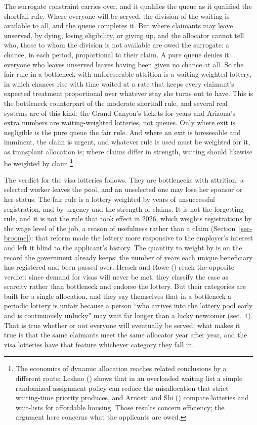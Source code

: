 \documentclass[
  11pt,
  letterpaper,
  DIV=11,
  numbers=noendperiod,
  twoside]{scrartcl}
\begin{document}
The surrogate constraint carries over, and it qualifies the queue as it
qualified the shortfall rule. Where everyone will be served, the
division of the waiting is available to all, and the queue completes it.
But where claimants may leave unserved, by dying, losing eligibility, or
giving up, and the allocator cannot tell who, those to whom the division
is not available are owed the surrogate: a chance, in each period,
proportional to their claim. A pure queue denies it: everyone who leaves
unserved leaves having been given no chance at all. So the fair rule in
a bottleneck with unforeseeable attrition is a waiting-weighted lottery,
in which chances rise with time waited at a rate that keeps every
claimant's expected treatment proportional over whatever stay she turns
out to have. This is the bottleneck counterpart of the moderate
shortfall rule, and several real systems are of this kind: the Grand
Canyon's tickets-for-years and Arizona's extra numbers are
waiting-weighted lotteries, not queues. Only where exit is negligible is
the pure queue the fair rule. And where an exit is foreseeable and
imminent, the claim is urgent, and whatever rule is used must be
weighted for it, as transplant allocation is; where claims differ in
strength, waiting should likewise be weighted by claim.\footnote{The
  economics of dynamic allocation reaches related conclusions by a
  different route: Leshno () shows that
  in an overloaded waiting list a simple randomized assignment policy
  can reduce the misallocation that strict waiting-time priority
  produces, and Arnosti and Shi ()
  compare lotteries and wait-lists for affordable housing. Those results
  concern efficiency; the argument here concerns what the applicants are
  owed.}

The verdict for the visa lotteries follows. They are bottlenecks with
attrition: a selected worker leaves the pool, and an unselected one may
lose her sponsor or her status. The fair rule is a lottery weighted by
years of unsuccessful registration, and by urgency and the strength of
claims. It is not the forgetting rule, and it is not the rule that took
effect in 2026, which weights registrations by the wage level of the
job, a reason of usefulness rather than a claim
(Section~\ref{sec-broome}): that reform made the lottery more responsive
to the employer's interest and left it blind to the applicant's history.
The quantity to weight by is on the record the government already keeps:
the number of years each unique beneficiary has registered and been
passed over. Hersch and Rowe () reach the opposite verdict: since demand for visas will never be
met, they classify the case as scarcity rather than bottleneck and
endorse the lottery. But their categories are built for a single
allocation, and they say themselves that in a bottleneck a periodic
lottery is unfair because a person ``who arrives into the lottery pool
early and is continuously unlucky'' may wait far longer than a lucky
newcomer (sec.~4). That is true whether or not everyone will eventually
be served; what makes it true is that the same claimants meet the same
allocator year after year, and the visa lotteries have that feature
whichever category they fall in.
\end{document}
